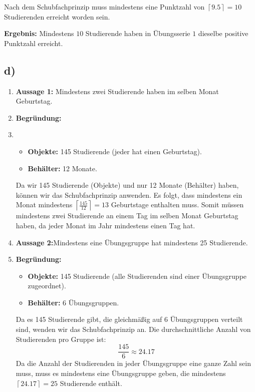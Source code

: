 \documentclass[a4paper]{scrartcl}
\begin{document}
Nach dem Schubfachprinzip muss mindestens eine Punktzahl von \(\left\lceil 9.5 \right\rceil = 10\) Studierenden erreicht worden sein.

\textbf{Ergebnis:} Mindestens \(10\) Studierende haben in Übungsserie \(1\) dieselbe positive Punktzahl erreicht.

\subsection*{d)}
\begin{enumerate}
  \item \textbf{Aussage 1:} Mindestens zwei Studierende haben im selben Monat Geburtstag.
  \item \textbf{Begründung:}
  \item \begin{itemize}
    \item \textbf{Objekte:} 145 Studierende (jeder hat einen Geburtstag).
    \item \textbf{Behälter:} 12 Monate.
  \end{itemize}
  Da wir 145 Studierende (Objekte) und nur 12 Monate (Behälter) haben, können wir das Schubfachprinzip anwenden. Es folgt, dass mindestens ein Monat mindestens \(\left\lceil \frac{145}{12} \right\rceil = 13\) Geburtstage enthalten muss. Somit müssen mindestens zwei Studierende an einem Tag im selben Monat Geburtstag haben, da jeder Monat im Jahr mindestens einen Tag hat.
  \item \textbf{Aussage 2:}Mindestens eine Übungsgruppe hat mindestens 25 Studierende.
  \item \textbf{Begründung:}
  \begin{itemize}
    \item \textbf{Objekte:} 145 Studierende (alle Studierenden sind einer Übungsgruppe zugeordnet).
    \item \textbf{Behälter:} 6 Übungsgruppen.
\end{itemize}

Da es 145 Studierende gibt, die gleichmäßig auf 6 Übungsgruppen verteilt sind, wenden wir das Schubfachprinzip an. Die durchschnittliche Anzahl von Studierenden pro Gruppe ist:
\[
\frac{145}{6} \approx 24.17
\]
Da die Anzahl der Studierenden in jeder Übungsgruppe eine ganze Zahl sein muss, muss es mindestens eine Übungsgruppe geben, die mindestens \(\left\lceil 24.17 \right\rceil = 25\) Studierende enthält. 
\end{enumerate}
\end{document}
